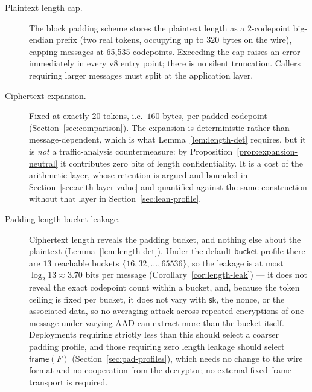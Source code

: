 \documentclass[11pt,a4paper]{article}
\begin{document}
\begin{description}
  \item[Plaintext length cap.] The block padding scheme stores the
        plaintext length as a 2-codepoint big-endian prefix (two real
        tokens, occupying up to $320$ bytes on the wire), capping messages
        at 65{,}535 codepoints. Exceeding the cap raises an error
        immediately in every v8 entry point; there is no silent truncation.
        Callers requiring
        larger messages must split at the application layer.

  \item[Ciphertext expansion.] Fixed at exactly $20$ tokens, i.e.\ $160$
        bytes, per padded codepoint (Section~\ref{sec:comparison}). The
        expansion is deterministic rather than message-dependent, which is
        what Lemma~\ref{lem:length-det} requires, but it is \emph{not} a
        traffic-analysis countermeasure: by
        Proposition~\ref{prop:expansion-neutral} it contributes zero bits
        of length confidentiality. It is a cost of the arithmetic layer,
        whose retention is argued and bounded in
        Section~\ref{sec:arith-layer-value} and quantified against the same
        construction without that layer in Section~\ref{sec:lean-profile}.

  \item[Padding length-bucket leakage.] Ciphertext length reveals the
        padding bucket, and nothing else about the plaintext
        (Lemma~\ref{lem:length-det}). Under the default $\mathsf{bucket}$
        profile there are $13$ reachable buckets
        $\{16,32,\ldots,65536\}$, so the leakage is at most
        $\log_2 13\approx3.70$ bits per message
        (Corollary~\ref{cor:length-leak}) — it does not reveal the exact
        codepoint count within a bucket, and, because the token ceiling is
        fixed per bucket, it does not vary with $\mathsf{sk}$, the nonce, or
        the associated data, so no averaging attack across repeated
        encryptions of one message under varying AAD can extract more than
        the bucket itself. Deployments requiring strictly less than this
        should select a coarser padding profile, and those requiring zero
        length leakage should select $\mathsf{frame}(F)$
        (Section~\ref{sec:pad-profiles}), which needs no change to the wire
        format and no cooperation from the decryptor; no external
        fixed-frame transport is required.


\end{description}
\end{document}

